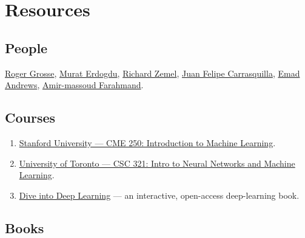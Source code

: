 \documentclass[a4paper, 12pt]{book}
\begin{document}
\chapter{Resources}
\label{ch:resources}

\section{People}

\href{https://www.cs.toronto.edu/~rgrosse/}{Roger Grosse}, \href{https://www.cs.toronto.edu/~murat/}{Murat Erdogdu}, \href{https://www.cs.toronto.edu/~zemel/}{Richard Zemel}, \href{https://www.cs.toronto.edu/~juan/}{Juan Felipe Carrasquilla}, \href{https://www.cs.toronto.edu/~emad/}{Emad Andrews}, \href{https://www.cs.toronto.edu/~amir/}{Amir-massoud Farahmand}.

\section{Courses}

\begin{enumerate}
    \item \href{https://web.stanford.edu/class/cme250/}{Stanford University --- CME 250:
    Introduction to Machine Learning}.
    \item \href{https://www.cs.toronto.edu/~rgrosse/courses/csc321_2018/}{University of
    Toronto --- CSC 321: Intro to Neural Networks and Machine Learning}.
    \item \href{https://www.d2l.ai/}{Dive into Deep Learning} --- an interactive,
    open-access deep-learning book.
\end{enumerate}

\section{Books}
\end{document}
